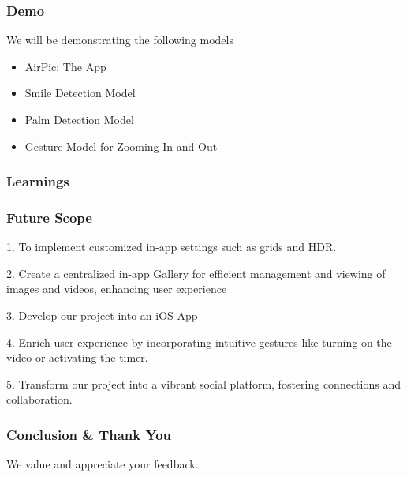 \documentclass{beamer}
\begin{document}

\begin{frame}
\frametitle{Demo}
\begin{block}{We will be demonstrating the following models}
\begin{itemize}
    \item AirPic: The App
    \item Smile Detection Model
    \item Palm Detection Model
    \item Gesture Model for Zooming In and Out
\end{itemize}
\end{block}
\end{frame}

\begin{frame}
\frametitle{Learnings}
\end{frame}

\begin{frame}
\frametitle{Future Scope}
\begin{block} {1. To implement customized in-app settings such as grids and HDR.}
\end{block}
\begin{block} {2. Create a centralized in-app Gallery for efficient management and viewing of images and videos, enhancing user experience}
\end{block}
\begin{block}{3. Develop our project into an iOS App}
\end{block}
\begin{block}{4. Enrich user experience by incorporating intuitive gestures like turning on the video or activating the timer.}
\end{block}
\begin{block}{5. Transform our project into a vibrant social platform, fostering connections and collaboration.}
\end{block}
\end{frame}

\begin{frame}
\frametitle{Conclusion \& Thank You}
\begin{block}
    {We value and appreciate your feedback.}
\end{block}
\end{frame}
\end{document}

